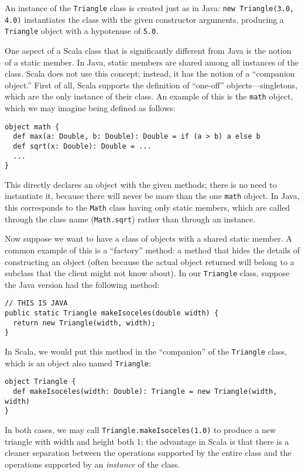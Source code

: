 \documentclass[11pt]{article}
\begin{document}
An instance of the \texttt{Triangle} class is created just as in Java: \texttt{new Triangle(3.0, 4.0)} instantiates the class with the given constructor arguments, producing a \texttt{Triangle} object with a hypotenuse of \texttt{5.0}.

One aspect of a Scala class that is significantly different from Java is the notion of a static member. In Java, static members are shared among all instances of the class. Scala does not use this concept; instead, it has the notion of a ``companion object.'' First of all, Scala supports the definition of ``one-off'' objects---singletons, which are the only instance of their class. An example of this is the \texttt{math} object, which we may imagine being defined as follows:
\begin{verbatim}
object math {
  def max(a: Double, b: Double): Double = if (a > b) a else b
  def sqrt(x: Double): Double = ...
  ...
}
\end{verbatim}
This directly declares an object with the given methods; there is no need to instantiate it, because there will never be more than the one \texttt{math} object. In Java, this corresponds to the \texttt{Math} class having only static members, which are called through the class name (\texttt{Math.sqrt}) rather than through an instance.

Now suppose we want to have a class of objects with a shared static member. A common example of this is a ``factory'' method: a method that hides the details of constructing an object (often because the actual object returned will belong to a subclass that the client might not know about). In our \texttt{Triangle} class, suppose the Java version had the following method:
\begin{verbatim}
// THIS IS JAVA
public static Triangle makeIsoceles(double width) {
  return new Triangle(width, width);
}
\end{verbatim}
In Scala, we would put this method in the ``companion'' of the \texttt{Triangle} class, which is an object also named \texttt{Triangle}:
\begin{verbatim}
object Triangle {
  def makeIsoceles(width: Double): Triangle = new Triangle(width, width)
}
\end{verbatim}
In both cases, we may call \texttt{Triangle.makeIsoceles(1.0)} to produce a new triangle with width and height both 1; the advantage in Scala is that there is a cleaner separation between the operations supported by the entire class and the operations supported by an \emph{instance} of the class.
\end{document}
